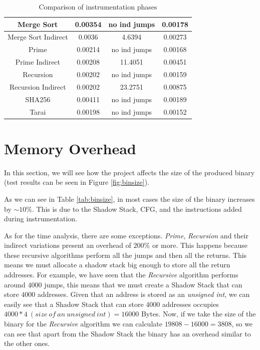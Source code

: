\begin{table}
\begin{tabular}{|c|c|c|c|}
    \hline
    Merge Sort           & 0.00354                      & no ind jumps            & 0.00178                     \\
    \hline
    Merge Sort Indirect  & 0.0036                       & 4.6394                  & 0.00273                     \\
    \hline
    Prime                & 0.00214                      & no ind jumps            & 0.00168                     \\
    \hline
    Prime Indirect       & 0.00208                      & 11.4051                 & 0.00451                     \\
    \hline
    Recursion            & 0.00202                      & no ind jumps            & 0.00159                     \\
    \hline
    Recursion Indirect   & 0.00202                      & 23.2751                 & 0.00875                     \\
    \hline
    SHA256               & 0.00411                      & no ind jumps            & 0.00189                     \\
    \hline
    Tarai                & 0.00198                      & no ind jumps            & 0.00152                     \\
    \hline
  \end{tabular}
  \caption{Comparison of instrumentation phases}
  \label{tab:othertimes}
\end{table}

\section{Memory Overhead}
\label{sec:pa_memory}

In this section, we will see how the project affects the size of the produced binary
(test results can be seen in Figure \ref{fig:binsize}).

As we can see in Table \ref{tab:binsize}, in most cases the size of the binary
increases by $\sim 10\%$. This is due to the Shadow Stack, CFG, and the instructions
added during instrumentation.

As for the time analysis, there are some exceptions. \textit{Prime}, \textit{Recursion}
and their indirect variations present an overhead of $200\%$ or more. This happens
because these recursive algorithms perform all the jumps and then all the returns.
This means we must allocate a shadow stack big enough to store all the return
addresses. For example, we have seen that the \textit{Recursive} algorithm performs
around $4000$ jumps, this means that we must create a Shadow Stack that can
store $4000$ addresses. Given that an address is stored as an \textit{unsigned
int}, we can easily see that a Shadow Stack that can store $4000$ addresses occupies
$4000*4 \ (size \ of \ an \ unsigned \ int) = 16000$ Bytes. Now, if we take the size
of the binary for the \textit{Recursive} algorithm we can calculate
$19808 - 16000 = 3808$, so we can see that apart from the Shadow Stack the binary
has an overhead similar to the other ones.

